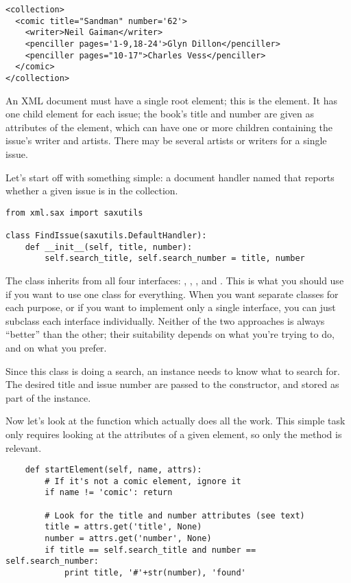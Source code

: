 \documentclass{howto}
\newcommand{\element}[1]{\code{#1}}
\begin{document}
\begin{verbatim}
<collection>
  <comic title="Sandman" number='62'>
    <writer>Neil Gaiman</writer>
    <penciller pages='1-9,18-24'>Glyn Dillon</penciller>
    <penciller pages="10-17">Charles Vess</penciller>
  </comic>
</collection>
\end{verbatim}

An XML document must have a single root element; this is the
 element.  It has one child \element{comic} element
for each issue; the book's title and number are given as attributes of
the \element{comic} element, which can have one or more children
containing the issue's writer and artists.  There may be several
artists or writers for a single issue.

Let's start off with something simple: a document handler named
 that reports whether a given issue is in the
collection.

\begin{verbatim}
from xml.sax import saxutils

class FindIssue(saxutils.DefaultHandler):
    def __init__(self, title, number):
        self.search_title, self.search_number = title, number
\end{verbatim}

The  class inherits from all four interfaces:
, , ,
and .  This is what you should use if you want to
use one class for everything.  When you want separate classes for each
purpose, or if you want to implement only a single interface, you can
just subclass each interface individually.  Neither of the two
approaches is always ``better'' than the other; their suitability
depends on what you're trying to do, and on what you prefer.

Since this class is doing a search, an instance needs to know what to
search for.  The desired title and issue number are passed to the
 constructor, and stored as part of the instance.

Now let's look at the function which actually does all the work.
This simple task only requires looking at the attributes of a given
element, so only the  method is relevant.

\begin{verbatim}
    def startElement(self, name, attrs):
        # If it's not a comic element, ignore it
        if name != 'comic': return

        # Look for the title and number attributes (see text)
        title = attrs.get('title', None)
        number = attrs.get('number', None)
        if title == self.search_title and number == self.search_number:
            print title, '#'+str(number), 'found'
\end{verbatim}
\end{document}
